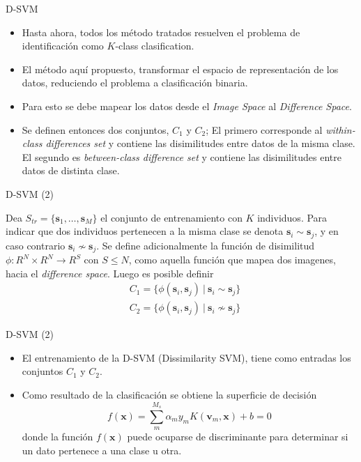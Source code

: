 \documentclass{beamer}
\begin{document}
\begin{frame}{D-SVM}
\begin{itemize}
    \item Hasta ahora, todos los método tratados resuelven el problema de identificación como
    $K$-class clasification.
    \item El método aquí propuesto, transformar el espacio de representación de los datos, reduciendo el problema
    a clasificación binaria.
    \item Para esto se debe mapear los datos desde el \textit{Image Space} al \textit{Difference Space}.
    \item Se definen entonces dos conjuntos, $C_1$ y $C_2$; El primero corresponde al \textit{within-class differences set} y contiene las disimilitudes entre datos de la misma clase. El segundo es \textit{between-class difference set} y contiene las disimilitudes entre datos de distinta clase.   
\end{itemize}
\end{frame}


\begin{frame}{D-SVM (2)}
\begin{definition}
 Dea $S_{tr} = \{\mathbf{s}_1 , \ldots, \mathbf{s}_M \}$ el conjunto de entrenamiento con $K$ individuos. Para indicar que dos individuos pertenecen a la misma clase se denota $\mathbf{s}_i \sim \mathbf{s}_j$, y en caso contrario $\mathbf{s}_i \nsim \mathbf{s}_j$. Se define adicionalmente la función de disimilitud $\phi : R^N \times R^N \rightarrow R^S$ con $S \leq N$, como aquella función que mapea dos imagenes, hacia el \textit{difference space}. Luego es posible definir
\begin{align}
& C_1 = \{\phi(\mathbf{s}_i, \mathbf{s}_j)\  | \ \mathbf{s}_i \sim \mathbf{s}_j \} \\
& C_2 = \{\phi(\mathbf{s}_i, \mathbf{s}_j)\  | \ \mathbf{s}_i \nsim \mathbf{s}_j \}
\end{align}
\end{definition}
\end{frame}

\begin{frame}{D-SVM (2)}
\begin{itemize}
    \item El entrenamiento de la D-SVM (Dissimilarity SVM), tiene como entradas los conjuntos $C_1$ y $C_2$.
    \item Como resultado de la clasificación se obtiene la superficie de decisión
$$
f(\mathbf{x}) = \sum_m^{M_s} \alpha_m y_m K(\mathbf{v}_m, \mathbf{x}) + b = 0
$$
    donde la función $f(\mathbf{x})$ puede ocuparse de discriminante para determinar si un dato pertenece a una clase u otra.
\end{itemize}
\end{frame}
    
\end{document}
